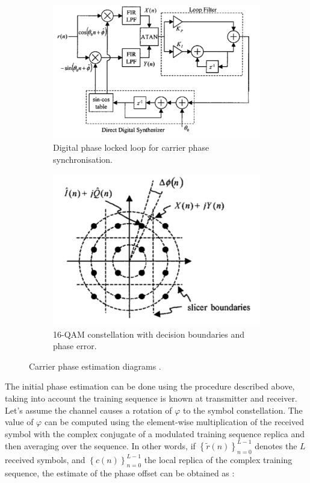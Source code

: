 \documentclass[12pt,a4paper,openright]{report}
\begin{document}
 \begin{figure}[H]
 \centering
\begin{subfigure}{0.5\textwidth}
 \centering
    \includegraphics[width=0.9\linewidth]{DPLL.pdf}
    \caption{Digital phase locked loop for carrier phase \\ synchronisation. \\}
    \label{fig:DPLL}
\end{subfigure}%
\begin{subfigure}{0.5\textwidth}
 \centering
    \includegraphics[width=0.7\linewidth]{PD.pdf}
    \caption{16-QAM constellation with decision boundaries and phase error.}
    \label{fig:PD1}
    \end{subfigure}
    \caption[Carrier phase estimation diagrams]{Carrier phase estimation diagrams \cite{CarrierSynchPaper}.}
    \label{fig:carrierphase}
\end{figure}

The initial phase estimation can be done using the procedure described above, taking into account the training sequence is known at transmitter and receiver. Let's assume the channel causes a rotation of $\varphi$ to the symbol constellation. The value of $\varphi$ can be computed using the element-wise multiplication of the received symbol with the complex conjugate of a modulated training sequence replica and then averaging over the sequence. In other words, if ${\left\{ {\tilde r(n)} \right\}_{n = 0}^{L - 1}}$ denotes the $L$ received symbols, and ${\left\{ {c(n)} \right\}_{n = 0}^{L - 1}}$ the local replica of the complex training sequence, the estimate of the phase offset can be obtained as \cite{ProjectEQ2310}:
\end{document}
